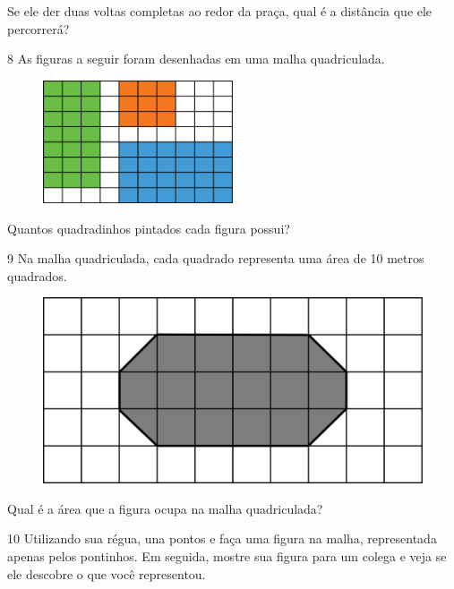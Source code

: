 Se ele der duas voltas completas ao redor da praça, qual é a distância que ele percorrerá?


\num{8} As figuras a seguir foram desenhadas em uma malha quadriculada.

\begin{figure}[htpb!]
\centering
\includegraphics[width=0.5\textwidth]{./media/image56.png}
\end{figure}

Quantos quadradinhos pintados cada figura possui?

\num{9} Na malha quadriculada, cada quadrado representa uma área de 10 metros quadrados.

\begin{figure}[htpb!]
\centering
\includegraphics[width=.6\textwidth]{./media/image60.png}
\end{figure}

Qual é a área que a figura ocupa na malha quadriculada?

\vspace{2em}

\num{10} Utilizando sua régua, una pontos e faça uma figura na malha, representada apenas pelos pontinhos. Em seguida, mostre sua
figura para um colega e veja se ele descobre o que você representou.

